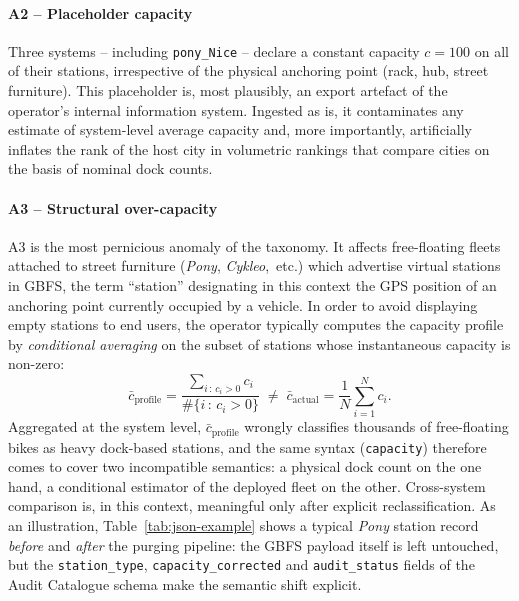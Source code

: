 \documentclass[a4paper,twoside]{article}
\makeatletter
\newcommand{\etc}{etc{.\@}}
\makeatother
\begin{document}
\paragraph{A2 -- Placeholder capacity}
Three systems -- including \texttt{pony\_Nice} -- declare a
constant capacity $c = 100$ on all of their stations,
irrespective of the physical anchoring point (rack, hub, street
furniture). This placeholder is, most plausibly, an export
artefact of the operator's internal information system. Ingested
as is, it contaminates any estimate of system-level average
capacity and, more importantly, artificially inflates the rank of
the host city in volumetric rankings that compare cities on the
basis of nominal dock counts.

\paragraph{A3 -- Structural over-capacity}
A3 is the most pernicious anomaly of the taxonomy. It affects
free-floating fleets attached to street furniture (\emph{Pony},
\emph{Cykleo},~\etc) which advertise virtual stations in GBFS,
the term ``station'' designating in this context the GPS position
of an anchoring point currently occupied by a vehicle. In order
to avoid displaying empty stations to end users, the operator
typically computes the capacity profile by \emph{conditional
averaging} on the subset of stations whose instantaneous capacity
is non-zero:
\begin{equation}
\bar{c}_{\text{profile}}
= \frac{\sum_{i\,:\,c_i > 0} c_i}{\#\{i\,:\,c_i > 0\}}
\;\neq\;
\bar{c}_{\text{actual}}
= \frac{1}{N}\sum_{i=1}^{N} c_i.
\label{eq:a3-bias}
\end{equation}
Aggregated at the system level, $\bar{c}_{\text{profile}}$
wrongly classifies thousands of free-floating bikes as heavy
dock-based stations, and the same syntax (\texttt{capacity})
therefore comes to cover two incompatible semantics: a physical
dock count on the one hand, a conditional estimator of the
deployed fleet on the other. Cross-system comparison is, in this
context, meaningful only after explicit reclassification. As an
illustration, Table~\ref{tab:json-example} shows a typical
\emph{Pony} station record \emph{before} and \emph{after} the
purging pipeline: the GBFS payload itself is left untouched, but
the \texttt{station\_type}, \texttt{capacity\_corrected} and
\texttt{audit\_status} fields of the Audit Catalogue schema make
the semantic shift explicit.
\end{document}
